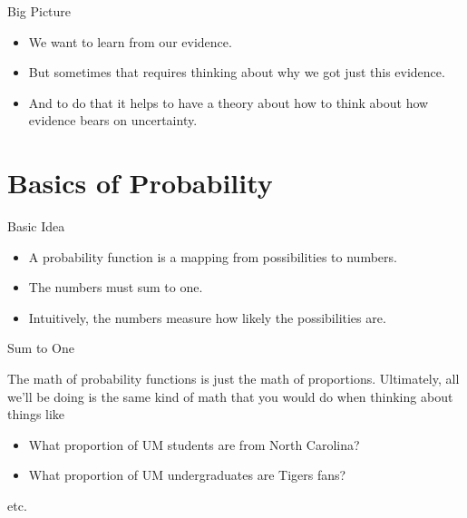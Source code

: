 \documentclass[
  ignorenonframetext,
]{beamer}
\providecommand{\tightlist}{%
  \setlength{\itemsep}{0pt}\setlength{\parskip}{0pt}}
\renewcommand{\,}{\text{, }}
\begin{document}
\begin{frame}{Big Picture}
\protect\hypertarget{big-picture}{}

\begin{itemize}
\tightlist
\item
  We want to learn from our evidence.
\item
  But sometimes that requires thinking about why we got just this
  evidence.
\item
  And to do that it helps to have a theory about how to think about how
  evidence bears on uncertainty.
\end{itemize}

\end{frame}

\hypertarget{basics-of-probability}{%
\section{Basics of Probability}\label{basics-of-probability}}

\begin{frame}{Basic Idea}
\protect\hypertarget{basic-idea}{}

\begin{itemize}
\tightlist
\item
  A probability function is a mapping from possibilities to numbers.
\item
  The numbers must sum to one.
\item
  Intuitively, the numbers measure how likely the possibilities are.
\end{itemize}

\end{frame}

\begin{frame}{Sum to One}
\protect\hypertarget{sum-to-one}{}

The math of probability functions is just the math of proportions.
Ultimately, all we'll be doing is the same kind of math that you would
do when thinking about things like

\begin{itemize}
\tightlist
\item
  What proportion of UM students are from North Carolina?
\item
  What proportion of UM undergraduates are Tigers fans?
\end{itemize}

etc.

\end{frame}
\end{document}
